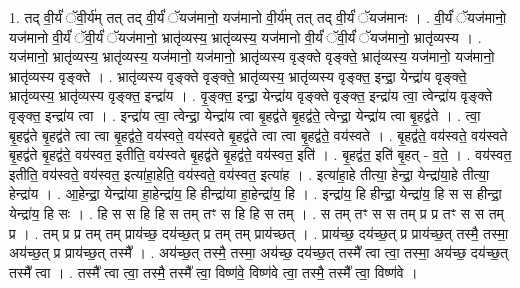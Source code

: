 \documentclass[17pt]{extarticle}
\begin{document}
1. तद् वी॒र्यं॑ ॅवी॒र्य॑म् तत् तद् वी॒र्यं॑ ॅयज॑मानो॒ यज॑मानो वी॒र्य॑म् तत् तद् वी॒र्यं॑ ॅयज॑मानः । . वी॒र्यं॑ ॅयज॑मानो॒ यज॑मानो वी॒र्यं॑ ॅवी॒र्यं॑ ॅयज॑मानो॒ भ्रातृ॑व्यस्य॒ भ्रातृ॑व्यस्य॒ यज॑मानो वी॒र्यं॑ ॅवी॒र्यं॑ ॅयज॑मानो॒ भ्रातृ॑व्यस्य । . यज॑मानो॒ भ्रातृ॑व्यस्य॒ भ्रातृ॑व्यस्य॒ यज॑मानो॒ यज॑मानो॒ भ्रातृ॑व्यस्य वृङ्क्ते वृङ्क्ते॒ भ्रातृ॑व्यस्य॒ यज॑मानो॒ यज॑मानो॒ भ्रातृ॑व्यस्य वृङ्क्ते । . भ्रातृ॑व्यस्य वृङ्क्ते वृङ्क्ते॒ भ्रातृ॑व्यस्य॒ भ्रातृ॑व्यस्य वृङ्क्त॒ इन्द्रा॒ येन्द्रा॑य वृङ्क्ते॒ भ्रातृ॑व्यस्य॒ भ्रातृ॑व्यस्य वृङ्क्त॒ इन्द्रा॑य । . वृ॒ङ्क्त॒ इन्द्रा॒ येन्द्रा॑य वृङ्क्ते वृङ्क्त॒ इन्द्रा॑य त्वा॒ त्वेन्द्रा॑य वृङ्क्ते वृङ्क्त॒ इन्द्रा॑य त्वा । . इन्द्रा॑य त्वा॒ त्वेन्द्रा॒ येन्द्रा॑य त्वा बृ॒हद्व॑ते बृ॒हद्व॑ते॒ त्वेन्द्रा॒ येन्द्रा॑य त्वा बृ॒हद्व॑ते । . त्वा॒ बृ॒हद्व॑ते बृ॒हद्व॑ते त्वा त्वा बृ॒हद्व॑ते॒ वय॑स्वते॒ वय॑स्वते बृ॒हद्व॑ते त्वा त्वा बृ॒हद्व॑ते॒ वय॑स्वते । . बृ॒हद्व॑ते॒ वय॑स्वते॒ वय॑स्वते बृ॒हद्व॑ते बृ॒हद्व॑ते॒ वय॑स्वत॒ इतीति॒ वय॑स्वते बृ॒हद्व॑ते बृ॒हद्व॑ते॒ वय॑स्वत॒ इति॑ । . बृ॒हद्व॑त॒ इति॑ बृ॒हत् - व॒ते॒ । . वय॑स्वत॒ इतीति॒ वय॑स्वते॒ वय॑स्वत॒ इत्या॑हा॒हेति॒ वय॑स्वते॒ वय॑स्वत॒ इत्या॑ह । . इत्या॑हा॒हे तीत्या॒ हेन्द्रा॒ येन्द्रा॑या॒हे तीत्या॒ हेन्द्रा॑य । . आ॒हेन्द्रा॒ येन्द्रा॑या हा॒हेन्द्रा॑य॒ हि हीन्द्रा॑या हा॒हेन्द्रा॑य॒ हि । . इन्द्रा॑य॒ हि हीन्द्रा॒ येन्द्रा॑य॒ हि स स हीन्द्रा॒ येन्द्रा॑य॒ हि सः । . हि स स हि हि स तम् तꣳ स हि हि स तम् । . स तम् तꣳ स स तम् प्र प्र तꣳ स स तम् प्र । . तम् प्र प्र तम् तम् प्राय॑च्छ॒ दय॑च्छ॒त् प्र तम् तम् प्राय॑च्छत् । . प्राय॑च्छ॒ दय॑च्छ॒त् प्र प्राय॑च्छ॒त् तस्मै॒ तस्मा॒ अय॑च्छ॒त् प्र प्राय॑च्छ॒त् तस्मै᳚ । . अय॑च्छ॒त् तस्मै॒ तस्मा॒ अय॑च्छ॒ दय॑च्छ॒त् तस्मै᳚ त्वा त्वा॒ तस्मा॒ अय॑च्छ॒ दय॑च्छ॒त् तस्मै᳚ त्वा । . तस्मै᳚ त्वा त्वा॒ तस्मै॒ तस्मै᳚ त्वा॒ विष्ण॑वे॒ विष्ण॑वे त्वा॒ तस्मै॒ तस्मै᳚ त्वा॒ विष्ण॑वे । \newline
\end{document}
